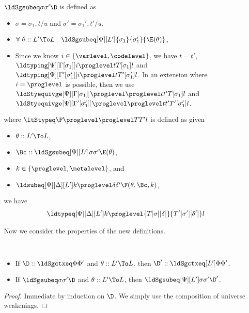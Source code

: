 $\ldSgsubeq \sigma{\sigma'} \D$ is defined as
\begin{itemize}
\item $\sigma = \sigma_1, t/u$ and $\sigma' = \sigma_1', t'/u$,
\item $\forall~\theta :: L' \To L ~.~
  \ldSgsubeq[\Psi][L']{\sigma_1}{\sigma_1'}{\E(\theta)}$,
\item Since we know $i \in \{\varlevel, \codelevel\}$, we have $t = t'$,
  $\ldtyping[\Psi][\Gamma[\sigma_1]] i \proglevel t{T[\sigma_1]} l$ and \break
  $\ldtyping[\Psi][\Gamma'[\sigma_1']] i \proglevel t{T'[\sigma_1']} l$. %
  In an extension where $i = \proglevel$ is possible, then we use \break
  $\ldStyequivge[\Psi][\Gamma[\sigma_1]] \proglevel \proglevel t{t'}{T[\sigma_1]} l$ and 
  $\ldStyequivge[\Psi][\Gamma'[\sigma_1']] \proglevel \proglevel t{t'}{T'[\sigma_1']} l$.
\end{itemize}
where $\ltStypeq \F \proglevel \proglevel T{T'} l$ is defined as given
\begin{itemize}
\item $\theta :: L' \To L$, 
\item $\Bc :: \ldSgsubeq[\Psi][L'] \sigma{\sigma'}{\E(\theta)}$,
\item $k \in \{\proglevel, \metalevel\}$, and
\item $\ldsubeq[\Psi][\Delta][L'] k \proglevel \delta{\delta'}{\F(\theta, \Bc, k)}$,
\end{itemize}
we have
\[
  \ldtypeq[\Psi][\Delta][L'] k \proglevel{T[\sigma][\delta]}{T'[\sigma'][\delta']} l
\]

Now we consider the properties of the new definitions.
\begin{lemma}[Weakening] $ $
  \begin{itemize}
  \item If $\D :: \ldSgctxeq \Phi{\Phi'}$ and $\theta :: L' \To L$, then
    $\D' :: \ldSgctxeq[L'] \Phi{\Phi'}$.
  \item If $\ldSgsubeq \sigma{\sigma'} \D$ and $\theta :: L' \To L$, then
    $\ldSgsubeq[\Psi][L'] \sigma{\sigma'}{\D'}$. 
  \end{itemize}
\end{lemma}
\begin{proof}
  Immediate by induction on $\D$. We simply use the composition of universe weakenings. 
\end{proof}


